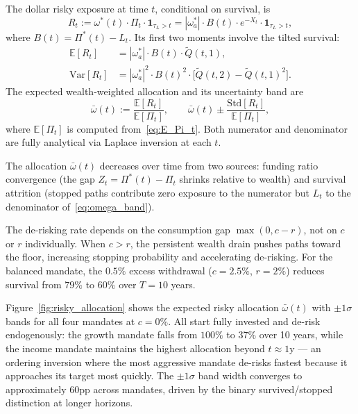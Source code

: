 \documentclass[11pt,a4paper]{article}
\numberwithin{equation}{section}
\newcommand{\E}{\mathbb{E}}
\newcommand{\Var}{\mathrm{Var}}
\newcommand{\ind}{\mathbf{1}}
\begin{document}
The dollar risky exposure at time $t$, conditional on survival, is
\begin{equation}\label{eq:R_t_def}
R_t := \omega^*(t) \cdot \Pi_t \cdot \ind_{\tau_L > t} 
= |\omega^*_a| \cdot B(t) \cdot e^{-X_t} \cdot \ind_{\tau_L > t},
\end{equation}
where $B(t) = \Pi^*(t) - L_t$. Its first two moments involve the tilted 
survival:
\begin{align}
\E[R_t] &= |\omega^*_a| \cdot B(t) \cdot \widetilde{Q}(t, 1), 
  \label{eq:E_Rt}\\
\Var[R_t] &= |\omega^*_a|^2 \cdot B(t)^2 \cdot 
  \bigl[\widetilde{Q}(t, 2) - \widetilde{Q}(t, 1)^2\bigr].
  \label{eq:Var_Rt}
\end{align}
The expected wealth-weighted allocation and its uncertainty band are
\begin{equation}\label{eq:omega_band}
\bar{\omega}(t) := \frac{\E[R_t]}{\E[\Pi_t]}, \qquad
\bar{\omega}(t) \pm \frac{\mathrm{Std}[R_t]}{\E[\Pi_t]},
\end{equation}
where $\E[\Pi_t]$ is computed from~\eqref{eq:E_Pi_t}. Both numerator 
and denominator are fully analytical via Laplace inversion at each $t$.

The allocation $\bar{\omega}(t)$ decreases over time from two sources: 
funding ratio convergence (the gap $Z_t = \Pi^*(t) - \Pi_t$ shrinks 
relative to wealth) and survival attrition (stopped paths contribute 
zero exposure to the numerator but $L_t$ to the denominator 
of~\eqref{eq:omega_band}).

The de-risking rate depends on the consumption gap $\max(0, c - r)$, not 
on $c$ or $r$ individually. When $c > r$, the persistent wealth drain 
pushes paths toward the floor, increasing stopping probability and 
accelerating de-risking. For the balanced mandate, the $0.5\%$ excess 
withdrawal ($c = 2.5\%$, $r = 2\%$) reduces survival from $79\%$ to 
$60\%$ over $T = 10$ years.



Figure~\ref{fig:risky_allocation} shows the expected risky allocation 
$\bar{\omega}(t)$ with $\pm 1\sigma$ bands for all four mandates at 
$c = 0\%$. All start fully invested and de-risk endogenously: the 
growth mandate falls from $100\%$ to $37\%$ over 10 years, while the 
income mandate maintains the highest allocation beyond $t \approx 1$y 
--- an ordering inversion where the most aggressive mandate de-risks 
fastest because it approaches its target most quickly. The $\pm 1\sigma$ 
band width converges to approximately $60$pp across mandates, driven 
by the binary survived/stopped distinction at longer horizons.
\end{document}
